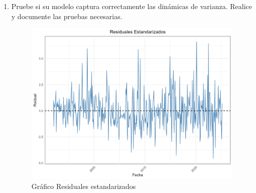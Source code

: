 \documentclass{article}
\theoremstyle{remark}
\theoremstyle{definition}
\begin{document}
\begin{enumerate}[label = \emph{\alph*})]
\begin{tcolorbox}[title=Soluci\'on 2.f]
            

            Al analizar el gr\'afico de los residuales al cuadrado, podemos ver algunos clusters de varianza, principalmente asociados con crisi econ\'omicas (2008, 2014, 2020). A su ve, la autocorrelaci\'on muestra varios rezagos que se salen de las bandas de confianza, lo que sugiere que hay componentes de la varianza que podemos predecir utilizando la historia de los residules. Finalmente se presenta la tabla con los resultados de una prueba Ljung-Box, donde se ve que la autocorrelci\'on es altamente significativa. Tiodos estos componentes hacen necesario la introducci\'on de din\'amicas de varianza para el modelo.\\
            Para modelar la varianza se escogi\'o un modelo GARCH(1,1), en el siguiente punto se muestra que el modelo captura correctamente las din\'amicas de varianza.
        \end{tcolorbox}
    \item {Pruebe si su modelo captura correctamente las din\'amicas de varianza. Realice y documente las pruebas necesarias.}
        \begin{tcolorbox}[title=Soluci\'on 2.g]
            \begin{figure}[H]
                \centering
                \includegraphics[width=0.9\linewidth]{output/graf_resistd.png}
                \caption{Gr\'afico Residuales estandarizados}
                \label{fig:graf_residstd}
            \end{figure}


\end{tcolorbox}
\end{enumerate}
\end{document}

